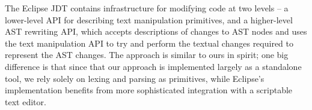 The Eclipse JDT contains infrastructure for modifying code at two levels -- a
lower-level API for describing text manipulation primitives, and a higher-level
AST rewriting API, which accepts descriptions of changes to AST nodes and uses
the text manipulation API to try and perform the textual changes required to
represent the AST changes. The approach is similar to ours in spirit; one big
difference is that since that our approach is implemented largely as a
standalone tool, we rely solely on lexing and parsing as primitives, while
Eclipse's implementation benefits from more sophisticated integration with a
scriptable text editor.
